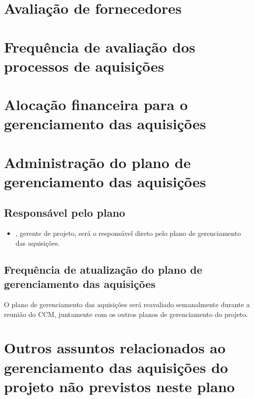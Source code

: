 \section{Avaliação de fornecedores}


\section{Frequência de avaliação dos processos de aquisições}


\section{Alocação financeira para o gerenciamento das aquisições}


\section{Administração do plano de gerenciamento das aquisições}

\subsection{Responsável pelo plano}

\begin{itemize}
	\item \projectManagerName{}, gerente de projeto, será o responsável direto pelo plano de gerenciamento das aquisições.
\end{itemize}

\subsection{Frequência de atualização do plano de gerenciamento das aquisições}

O plano de gerenciamento das aquisições será reavaliado semanalmente durante a reunião do CCM, juntamente com os outros planos de gerenciamento do projeto.

\section{Outros assuntos relacionados ao gerenciamento das aquisições do projeto não previstos neste plano}

